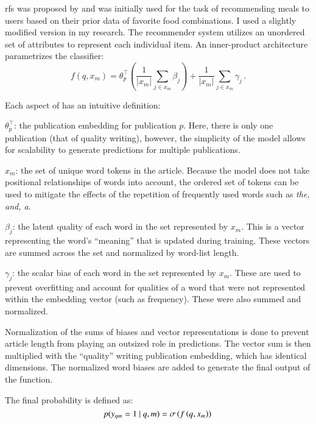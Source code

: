 \gls{rfs} was proposed by \textcite{altosaar2020rankfromsets:} and was initially used for the task of recommending meals to users based on their prior data of favorite food combinations. I used a slightly modified version in my research. The recommender system utilizes an unordered set of attributes to represent each individual item. An inner-product architecture parametrizes the classifier:
\begin{equation}
\label{eq:inner-product}
  f\left(q, x_m\right) = \theta_p^\top\left(\frac{1}{|x_m|}\sum_{j\in x_m}
  \beta_j\right) + \frac{1}{|x_m|}\sum_{j\in x_m}
  \gamma_j\, .
\end{equation}

Each aspect of  has an intuitive definition:

$\theta_p^\top$: the publication embedding for publication $p$. Here, there is only one 
publication (that of quality writing), however, the simplicity of the model allows for 
scalability to generate predictions for multiple publications.

$x_m$: the set of unique word tokens in the article. Because the model does not take 
positional relationships of words into account, the ordered set of tokens can be used to   
mitigate the effects of the repetition of frequently used words such as \emph{the, and, a}.

$\beta_j$: the latent quality of each word in the set represented by $x_m$. This is a vector representing the word’s “meaning” that is updated during training. These vectors are summed across the set and normalized by word-list length.

$\gamma_j$: the scalar bias of each word in the set represented by $x_m$. These are used to prevent overfitting and account for qualities of a word that were not represented within the embedding vector (such as frequency). These were also summed and normalized.

Normalization of the sums of biases and vector representations is done to prevent article length from playing an outsized role in predictions. The vector sum is then multiplied with the “quality” writing publication embedding, which has identical dimensions. The normalized word biases are added to generate the final output of the function.

The final probability is defined as:
\begin{equation}
\label{eq:sigmoid_rfs}
p(y_{qm} = 1 ~\vert~ q, m) = \sigma\left( f \left (q, x_m\right) \right)\, 
\end{equation}

